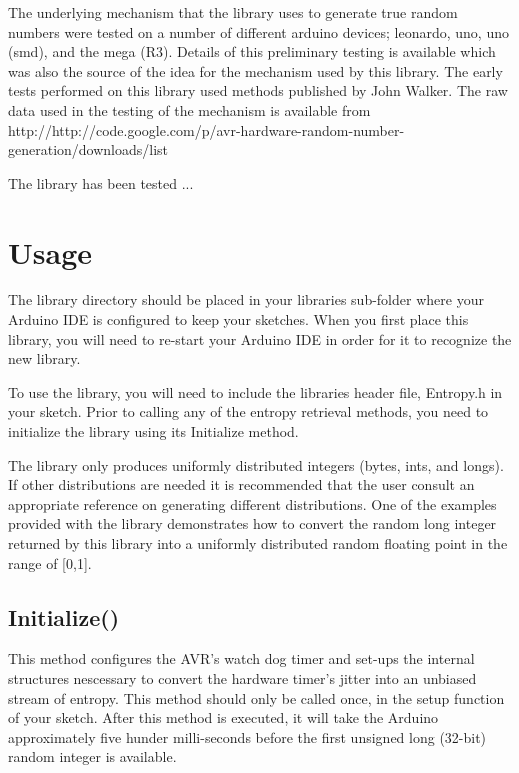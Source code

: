 \documentclass[10pt]{report}
\begin{document}
The underlying mechanism that the library uses to generate true random numbers were tested on a number of different arduino devices; leonardo, uno, uno (smd), and
the mega (R3).  Details of this preliminary testing is available \cite{ARDWDTRN} which was also the source of the idea for the mechanism used by this library. The early
tests performed on this library used methods published by John Walker. \cite{Walker2011} The raw data used in the testing of the mechanism is available from 
http://http://code.google.com/p/avr-hardware-random-number-generation/downloads/list

The library has been tested ...

\chapter{Usage}

The library directory should be placed in your libraries sub-folder where your Arduino IDE is configured to keep your sketches.  When you first place this library, you 
will need to re-start your Arduino IDE in order for it to recognize the new library.

To use the library, you will need to include the libraries header file, Entropy.h in your sketch.  Prior to calling any of the entropy retrieval methods, you need to 
initialize the library using its Initialize method.

The library only produces uniformly distributed integers (bytes, ints, and longs).  If other distributions are needed it is recommended that the user consult an 
appropriate reference \cite{Matloff2006} on generating different distributions.  One of the examples provided with the library demonstrates how to convert the random 
long integer returned by this library into a uniformly distributed random floating point in the range of [0,1].

\section{Initialize()}

This method configures the AVR's watch dog timer and set-ups the internal structures nescessary to convert the hardware timer's jitter into an unbiased stream of 
entropy.  This method should only be called once, in the setup function of your sketch.  After this method is executed, it will take the Arduino approximately
five hunder milli-seconds before the first unsigned long (32-bit) random integer is available.
\end{document}
